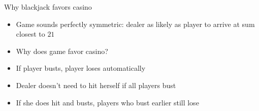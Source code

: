 \documentclass{beamer}
\theoremstyle{definition}
\begin{document}
\begin{frame}{Why blackjack favors casino}
\begin{itemize}
\item Game sounds perfectly symmetric: dealer as likely
as player to arrive at sum closest to $21$
\item Why does game favor casino?
\item If player busts, player loses automatically
\item Dealer doesn't need to hit herself if all players bust
\item If she does hit and busts, players who bust earlier still lose
\end{itemize}
\end{frame}
\end{document}

